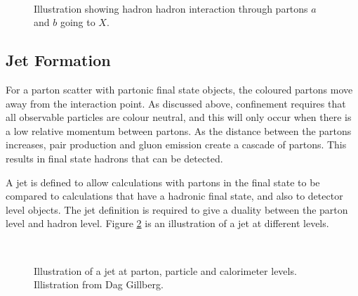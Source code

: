 \begin{figure}
\centering
\mbox{
                              }
\caption[]{
Illustration showing hadron hadron interaction through partons $a$ and $b$ going to $X$. 
\label{Theory:HadronHadron}}
\end{figure}


\subsection{Jet Formation}

For a parton scatter with partonic final state objects, the coloured partons move away from the interaction point.
As discussed above, confinement requires that all observable particles are colour neutral, and this will only occur when there is a low relative momentum between partons.
As the distance between the partons increases, pair production and gluon emission create a cascade of partons. 
This results in final state hadrons that can be detected.

A jet is defined to allow calculations with partons in the final state to be compared to calculations that have a hadronic final state, and also to detector level objects.
The jet definition is required to give a duality between the parton level and hadron level. 
Figure \ref{Theory:InitJet} is an illustration of a jet at different levels.


\begin{figure}
\centering
\mbox{
                              }
\caption[]{
Illustration of a jet at parton, particle and calorimeter levels. 
Illistration from Dag Gillberg.
\label{Theory:InitJet}}
\end{figure}

